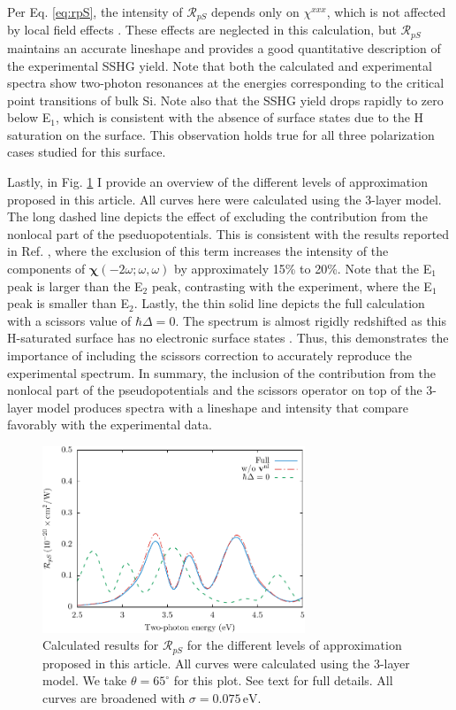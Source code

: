 Per Eq. \eqref{eq:rpS}, the intensity of $\mathcal{R}_{pS}$ depends only on
$\chi^{xxx}$, which is not affected by local field effects
\cite{tancognedejean:tel-01235611}. These effects are neglected in this
calculation, but $\mathcal{R}_{pS}$ maintains an accurate lineshape and provides
a good quantitative description of the experimental SSHG yield. Note that both
the calculated and experimental spectra show two-photon resonances at the
energies corresponding to the critical point transitions of bulk Si. Note also
that the SSHG yield drops rapidly to zero below E$_{1}$, which is consistent
with the absence of surface states due to the H saturation on the surface. This
observation holds true for all three polarization cases studied for this
surface.

Lastly, in Fig. \ref{fig:improvements} I provide an overview of the different
levels of approximation proposed in this article. All curves here were
calculated using the 3-layer model. The long dashed line depicts the effect of
excluding the contribution from the nonlocal part of the pseduopotentials. This
is consistent with the results reported in Ref. \cite{andersonPRB15}, where the
exclusion of this term increases the intensity of the components of
$\boldsymbol{\chi}(-2\omega;\omega,\omega)$ by approximately 15\% to 20\%. Note
that the E$_{1}$ peak is larger than the E$_{2}$ peak, contrasting with the
experiment, where the E$_{1}$ peak is smaller than E$_{2}$. Lastly, the thin
solid line depicts the full calculation with a scissors value of $\hbar\Delta =
0$. The spectrum is almost rigidly redshifted as this H-saturated surface has no
electronic surface states \cite{andersonPRB15}. Thus, this demonstrates the
importance of including the scissors correction to accurately reproduce the
experimental spectrum. In summary, the inclusion of the contribution from the
nonlocal part of the pseudopotentials and the scissors operator on top of the
3-layer model produces spectra with a lineshape and intensity that compare
favorably with the experimental data.

\begin{figure}
\centering
\includegraphics[width=0.7\textwidth]{content/figures/fig-4_4_03}
\caption{Calculated results for $\mathcal{R}_{pS}$ for the different levels of
approximation proposed in this article. All curves were calculated using the
3-layer model. We take $\theta=65^{\circ}$ for this plot. See text for full
details. All curves are broadened with $\sigma=0.075\,\text{eV}$.}
\label{fig:improvements}
\end{figure}


